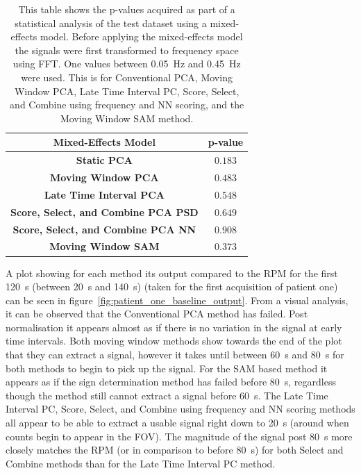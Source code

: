     \begin{table}
        \centering
        
        \captionsetup{singlelinecheck=false}
        \caption{This table shows the p-values acquired as part of a statistical analysis of the test dataset using a mixed-effects model. Before applying the mixed-effects model the signals were first transformed to frequency space using \gls{FFT}. One values between \SI{0.05}{\hertz} and \SI{0.45}{\hertz} were used. This is for Conventional \gls{PCA}, Moving Window \gls{PCA}, Late Time Interval \gls{PC}, Score, Select, and Combine using frequency and \gls{NN} scoring, and the Moving Window \gls{SAM} method.}
        
        \begin{tabular}{||c||c||}
            \hline
            \textbf{Mixed-Effects Model}                & \textbf{p-value} \\
            \hline
            \hline
            \textbf{Static PCA}                         & $0.183$ \\
            \hline
            \textbf{Moving Window PCA}                  & $0.483$ \\
            \hline
            \textbf{Late Time Interval PCA}             & $0.548$ \\
            \hline
            \textbf{Score, Select, and Combine PCA PSD} & $0.649$ \\
            \hline
            \textbf{Score, Select, and Combine PCA NN}  & $0.908$ \\
            \hline
            \textbf{Moving Window SAM}                  & $0.373$ \\
            \hline
        \end{tabular}
        \label{tab:statistical_analysis}
    \end{table}
    
    A plot showing for each method its output compared to the \gls{RPM} for the first \SI{120}{\second} (between \SI{20}{\second} and \SI{140}{\second}) (taken for the first acquisition of patient one) can be seen in figure~\ref{fig:patient_one_baseline_output}. From a visual analysis, it can be observed that the Conventional \gls{PCA} method has failed. Post normalisation it appears almost as if there is no variation in the signal at early time intervals. Both moving window methods show towards the end of the plot that they can extract a signal, however it takes until between \SI{60}{\second} and \SI{80}{\second} for both methods to begin to pick up the signal. For the \gls{SAM} based method it appears as if the sign determination method has failed before \SI{80}{\second}, regardless though the method still cannot extract a signal before \SI{60}{\second}. The Late Time Interval \gls{PC}, Score, Select, and Combine using frequency and \gls{NN} scoring methods all appear to be able to extract a usable signal right down to \SI{20}{\second} (around when counts begin to appear in the \gls{FOV}). The magnitude of the signal post \SI{80}{\second} more closely matches the \gls{RPM} (or in comparison to before \SI{80}{\second}) for both Select and Combine methods than for the Late Time Interval \gls{PC} method.
    
